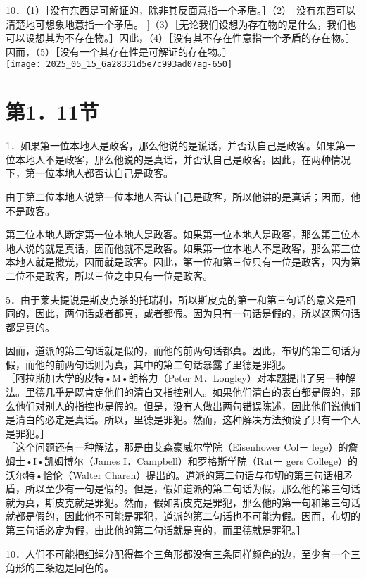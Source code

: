 10．（1）［没有东西是可解证的，除非其反面意指一个矛盾。］（2）［没有东西可以清楚地可想象地意指一个矛盾。 $]$（3）［无论我们设想为存在物的是什么，我们也可以设想其为不存在物。］因此，（4）［没有其不存在性意指一个矛盾的存在物。］因而，（5）［没有一个其存在性是可解证的存在物。］\\
\texttt{[image: 2025\_05\_15\_6a28331d5e7c993ad07ag-650]}

\section*{第1．11节}
1．如果第一位本地人是政客，那么他说的是谎话，并否认自己是政客。如果第一位本地人不是政客，那么他说的是真话，并否认自己是政客。因此，在两种情况下，第一位本地人都否认自己是政客。

由于第二位本地人说第一位本地人否认自己是政客，所以他讲的是真话；因而，他不是政客。

第三位本地人断定第一位本地人是政客。如果第一位本地人是政客，那么第三位本地人说的就是真话，因而他就不是政客。如果第一位本地人不是政客，那么第三位本地人就是撒兓，因而就是政客。因此，第一位和第三位只有一位是政客，因为第二位不是政客，所以三位之中只有一位是政客。

5．由于莱夫提说是斯皮克杀的托瑞利，所以斯皮克的第一和第三句话的意义是相同的，因此，两句话或者都真，或者都假。因为只有一句话是假的，所以这两句话都是真的。

因而，道派的第三句话就是假的，而他的前两句话都真。因此，布切的第三句话为假，而他的前两句话则为真，其中的第二句话暴露了里德是罪犯。\\
［阿拉斯加大学的皮特•M•朗格力（Peter M．Longley）对本题提出了另一种解法。里德几乎是既肯定他们的清白又指控别人。如果他们清白的表白都是假的，那么他们对别人的指控也是假的。但是，没有人做出两句错误陈述，因此他们说他们是清白的必定是真话。所以，里德是罪犯。然而，这种解决方法预设了只有一个人是罪犯。］\\
［这个问题还有一种解法，那是由艾森豪威尔学院（Eisenhower Col－ lege）的詹姆士•I•凯姆博尔（James I．Campbell）和罗格斯学院（Rut－ gers College）的沃尔特•恰伦（Walter Charen）提出的。道派的第二句话与布切的第三句话相矛盾，所以至少有一句是假的。但是，假如道派的第二句话为假，那么他的第三句话就为真，斯皮克就是罪犯。然而，假如斯皮克是罪犯，那么他的第一句和第三句话就都是假的，因此他不可能是罪犯，道派的第二句话也不可能为假。因而，布切的第三句话必定为假，由此他的第二句话就是真的，而里德就是罪犯。］

10．人们不可能把细绳分配得每个三角形都没有三条同样颜色的边，至少有一个三角形的三条边是同色的。

